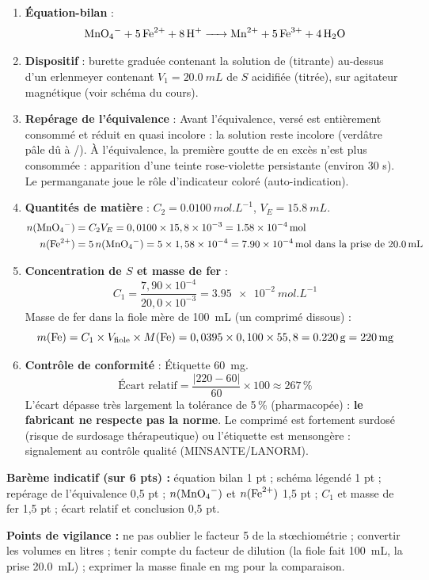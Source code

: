 \documentclass[11pt]{article}
\newcommand{\cle}[1]{{\popxbold\color{popdark}#1}}
\begin{document}
\begin{corrige}
\begin{enumerate}
\item \textbf{Équation-bilan} :
\[ \ce{MnO4- + 5Fe^2+ + 8H+ -> Mn^2+ + 5Fe^3+ + 4H2O} \]
\item \textbf{Dispositif} : burette graduée contenant la solution de  (titrante) au-dessus d'un erlenmeyer contenant $V_1 = \SI{20,0}{mL}$ de $S$ acidifiée (titrée), sur agitateur magnétique (voir schéma du cours).
\item \textbf{Repérage de l'équivalence} : Avant l'équivalence,  versé est entièrement consommé et réduit en  quasi incolore : la solution reste incolore (verdâtre pâle dû à /). À l'équivalence, la première goutte de  en excès n'est plus consommée : apparition d'une \cle{teinte rose-violette persistante} (environ 30 s). Le permanganate joue le rôle d'indicateur coloré (auto-indication).
\item \textbf{Quantités de matière} : $C_2 = \SI{0,0100}{mol.L^{-1}}$, $V_E = \SI{15,8}{mL}$.
\begin{align*}
n(\ce{MnO4-}) &= C_2 V_E = 0,0100 \times 15,8\times10^{-3} = \SI{1,58e-4}{mol} \\
n(\ce{Fe^2+}) &= 5\,n(\ce{MnO4-}) = 5 \times 1,58\times10^{-4} = \SI{7,90e-4}{mol} \text{ dans la prise de } \SI{20,0}{mL}
\end{align*}
\item \textbf{Concentration de $S$ et masse de fer} :
\[ C_1 = \frac{7,90\times10^{-4}}{20,0\times10^{-3}} = \SI{3,95e-2}{mol.L^{-1}} \]
Masse de fer dans la fiole mère de \SI{100}{mL} (un comprimé dissous) :
\[ m(\ce{Fe}) = C_1 \times V_{\text{fiole}} \times M(\ce{Fe}) = 0,0395 \times 0,100 \times 55,8 = \SI{0,220}{g} = \SI{220}{mg} \]
\item \textbf{Contrôle de conformité} : Étiquette \SI{60}{mg}.
\[ \text{Écart relatif} = \frac{|220 - 60|}{60} \times 100 \approx 267\,\% \]
L'écart dépasse très largement la tolérance de 5\,\% (pharmacopée) : \textbf{le fabricant ne respecte pas la norme}. Le comprimé est fortement surdosé (risque de surdosage thérapeutique) ou l'étiquette est mensongère : signalement au contrôle qualité (MINSANTE/LANORM).
\end{enumerate}
\textbf{Barème indicatif (sur 6 pts) :} équation bilan 1 pt ; schéma légendé 1 pt ; repérage de l'équivalence 0,5 pt ; $n(\ce{MnO4-})$ et $n(\ce{Fe^2+})$ 1,5 pt ; $C_1$ et masse de fer 1,5 pt ; écart relatif et conclusion 0,5 pt.

\textbf{Points de vigilance :} ne pas oublier le facteur 5 de la stœchiométrie ; convertir les volumes en litres ; tenir compte du facteur de dilution (la fiole fait \SI{100}{mL}, la prise \SI{20,0}{mL}) ; exprimer la masse finale en mg pour la comparaison.
\end{corrige}
\end{document}
